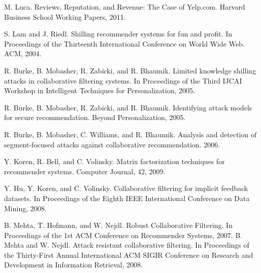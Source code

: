\documentclass[master,english,final]{kaist-ucs}
\begin{document}
\begin{thebibliography}{00}

 M. Luca. Reviews, Reputation, and Revenue: The Case of Yelp.com. Harvard Business School Working Papers, 2011.

 S. Lam and J. Riedl. Shilling recommender systems for fun and profit. In Proceedings of the Thirteenth International Conference on World Wide Web. ACM, 2004.

 R. Burke, B. Mobasher, R. Zabicki, and R. Bhaumik. Limited knowledge shilling attacks in collaborative filtering systems. In Proceedings of the Third IJCAI Workshop in Intelligent Techniques for Personalization, 2005.

 R. Burke, B. Mobasher, R. Zabicki, and R. Bhaumik. Identifying attack models for secure recommendation. Beyond Personalization, 2005.

 R. Burke, B. Mobasher, C. Williams, and R. Bhaumik. Analysis and detection of segment-focused attacks against collaborative recommendation. 2006.

 Y. Koren, R. Bell, and C. Volinsky. Matrix factorization techniques for recommender systems. Computer Journal, 42, 2009.

 Y. Hu, Y. Koren, and C. Volinsky. Collaborative filtering for implicit feedback datasets. In Proceedings of the Eighth IEEE International Conference on Data Mining, 2008.

 B. Mehta, T. Hofmann, and W. Nejdl. Robust Collaborative Filtering. In Proceedings of the 1st ACM Conference on Recommender Systems, 2007.
 B. Mehta and W. Nejdl. Attack resistant collaborative filtering. In Proceedings of the Thirty-First Annual International ACM SIGIR Conference on Research and Development in Information Retrieval, 2008.


\end{thebibliography}
\end{document}
